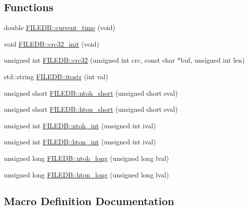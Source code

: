 \subsection*{Functions}
\begin{DoxyCompactItemize}
\item 
double \mbox{\hyperlink{namespaceFILEDB_a52d0505cdd535797c05bffb0598ef2a5}{F\+I\+L\+E\+D\+B\+::current\+\_\+time}} (void)
\item 
void \mbox{\hyperlink{namespaceFILEDB_ad0296230a6c6ba4b757820d4367275a4}{F\+I\+L\+E\+D\+B\+::crc32\+\_\+init}} (void)
\item 
unsigned int \mbox{\hyperlink{namespaceFILEDB_aa12ea161a9698d1b53c1026b06f0b0a5}{F\+I\+L\+E\+D\+B\+::crc32}} (unsigned int crc, const char $\ast$buf, unsigned int len)
\item 
std\+::string \mbox{\hyperlink{namespaceFILEDB_a00ba2326eea8f8eb8dc3b4be5eac2bf3}{F\+I\+L\+E\+D\+B\+::itostr}} (int val)
\item 
unsigned short \mbox{\hyperlink{namespaceFILEDB_af28aef063f95fcb331d3844f6807daf5}{F\+I\+L\+E\+D\+B\+::ntoh\+\_\+short}} (unsigned short sval)
\item 
unsigned short \mbox{\hyperlink{namespaceFILEDB_acbb57ab648e150c1950a7e6a67a6aa56}{F\+I\+L\+E\+D\+B\+::hton\+\_\+short}} (unsigned short sval)
\item 
unsigned int \mbox{\hyperlink{namespaceFILEDB_ab34ff6954f1b3a0dc868119d34105579}{F\+I\+L\+E\+D\+B\+::ntoh\+\_\+int}} (unsigned int ival)
\item 
unsigned int \mbox{\hyperlink{namespaceFILEDB_adbce406e3e06947d7312a6d461bc5cc5}{F\+I\+L\+E\+D\+B\+::hton\+\_\+int}} (unsigned int ival)
\item 
unsigned long \mbox{\hyperlink{namespaceFILEDB_af2fbdeeb7148fa47d1050b1ac3130897}{F\+I\+L\+E\+D\+B\+::ntoh\+\_\+long}} (unsigned long lval)
\item 
unsigned long \mbox{\hyperlink{namespaceFILEDB_af381773a642a4cc9c68ce682cea411a8}{F\+I\+L\+E\+D\+B\+::hton\+\_\+long}} (unsigned long lval)
\end{DoxyCompactItemize}


\subsection{Macro Definition Documentation}
\mbox{\label{adat-devel_2other__libs_2filedb_2src_2FileDB_8cpp_a1575e02ec8b15cac1d928e834b47b068}} 
